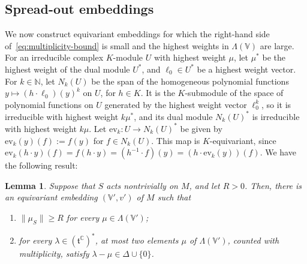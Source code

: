 \documentclass{article}
\newcommand{\N}{\mathbb{N}}
\newcommand{\C}{\mathbb{C}}
\newcommand{\frakt}{\mathfrak{t}}
\newtheorem{lemma}{Lemma}
\theoremstyle{definition}
\theoremstyle{plain}
\begin{document}
\subsection{Spread-out embeddings}\label{ssec:spread}

We now construct equivariant embeddings for which the right-hand side of~\eqref{eq:multiplicity-bound} is small and the highest weights in $\Lambda(\mathbb V)$ are large.
For an irreducible complex $K$-module $U$ with highest weight $\mu$, let $\mu^*$ be the highest weight of the dual module $U^*$, and $\ell_0\in U^*$ be a highest weight vector.
For $k\in\N$, let $N_k(U)$ be the span of the homogeneous polynomial functions $y\mapsto(h\cdot\ell_0)(y)^k$ on $U$, for $h\in K$.
It is the $K$-submodule of the space of polynomial functions on $U$ generated by the highest weight vector $\ell_0^k$, so it is irreducible with highest weight $k\mu^*$,
  and its dual module $N_k(U)^*$ is irreducible with highest weight $k\mu$.
Let $\mathrm{ev}_k\colon U\to N_k(U)^*$ be given by $\mathrm{ev}_k(y)(f):=f(y)$ for $f\in N_k(U)$.
This map is $K$-equivariant, since $\mathrm{ev}_k(h\cdot y)(f)=f(h\cdot y)=(h^{-1}\cdot f)(y)=(h\cdot\mathrm{ev}_k(y))(f)$.
We have the following result:

\begin{lemma}\label{lem:spread}
Suppose that $S$ acts nontrivially on $M$, and let $R>0$.
Then, there is an equivariant embedding $(\mathbb V',v')$ of $M$ such that
\begin{enumerate}
\item $\|\mu_S\|\geq R$ for every $\mu\in\Lambda(\mathbb V')$;
\item for every $\lambda\in(\frakt^\C)^*$, at most two elements $\mu$ of $\Lambda(\mathbb V')$, counted with multiplicity, satisfy $\lambda-\mu\in\Delta\cup\{0\}$.
\end{enumerate}
\end{lemma}
\end{document}
